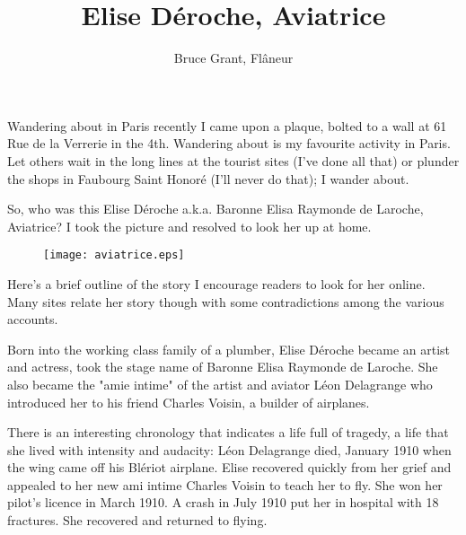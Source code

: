 %


\title{Elise D\'{e}roche, Aviatrice}
\author{Bruce Grant, Fl\^{a}neur}

\maketitle

Wandering about in Paris recently I came upon a plaque, bolted to a
wall at 61 Rue de la Verrerie in the 4th. Wandering about is my
favourite activity in Paris. Let others wait in the long lines at the
tourist sites (I've done all that) or plunder the shops in Faubourg
Saint Honor\'{e} (I'll never do that); I wander about.

So, who was this Elise D\'{e}roche a.k.a. Baronne Elisa Raymonde de
Laroche, Aviatrice?  I took the picture and resolved to look her up at
home.

\begin{figure}[htbp]
   \vspace{2em}
   \centering
   \texttt{[image: aviatrice.eps]}
   \label{fig:aviatrice}
\end{figure}

Here's a brief outline of the story I encourage readers to look
for her online.  Many sites relate her story though with some
contradictions among the various accounts.

Born into the working class family of a plumber, Elise D\'{e}roche
became an artist and actress, took the stage name of Baronne Elisa
Raymonde de Laroche. She also became the "amie intime" of the artist
and aviator L\'{e}on Delagrange who introduced her to his friend Charles
Voisin, a builder of airplanes.

There is an interesting chronology that indicates a life full of
tragedy, a life that she lived with intensity and audacity: L\'{e}on
Delagrange died, January 1910 when the wing came off his Bl\'{e}riot
airplane. Elise recovered quickly from her grief and appealed to her
new ami intime Charles Voisin to teach her to fly. She won her pilot's
licence in March 1910. A crash in July 1910 put her in hospital with
18 fractures. She recovered and returned to flying.

